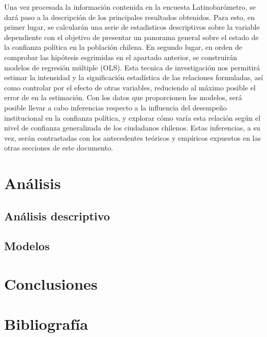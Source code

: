 \documentclass[12pt,twoside]{templates/facsothesis}
\begin{document}
Una vez procesada la información contenida en la encuesta Latinobarómetro, se dará paso a la descripción de los principales resultados obtenidos. Para esto, en primer lugar, se calcularán una serie de estadisticos descriptivos sobre la variable dependiente con el objetivo de presentar un panorama general sobre el estado de la confianza política en la población chilena. En segundo lugar, en orden de comprobar las hipótesis esgrimidas en el apartado anterior, se construirán modelos de regresión múltiple (OLS). Esta tecnica de investigación nos permitirá estimar la intensidad y la significación estadística de las relaciones formuladas, así como controlar por el efecto de otras variables, reduciendo al máximo posible el error de en la estimación. Con los datos que proporcionen los modelos, será posible llevar a cabo inferencias respecto a la influencia del desempeño institucional en la confianza política, y explorar cómo varía esta relación según el nivel de confianza generalizada de los ciudadanos chilenos. Estas inferencias, a su vez, serán contrastadas con los antecedentes teóricos y empíricos expuestos en las otras secciones de este documento.

\chapter{Análisis}\label{anuxe1lisis}

\section{Análisis descriptivo}\label{anuxe1lisis-descriptivo}

\section{Modelos}\label{modelos}

\chapter{Conclusiones}\label{conclusiones}

\chapter*{Bibliografía}\label{bibliografuxeda}



\end{document}
